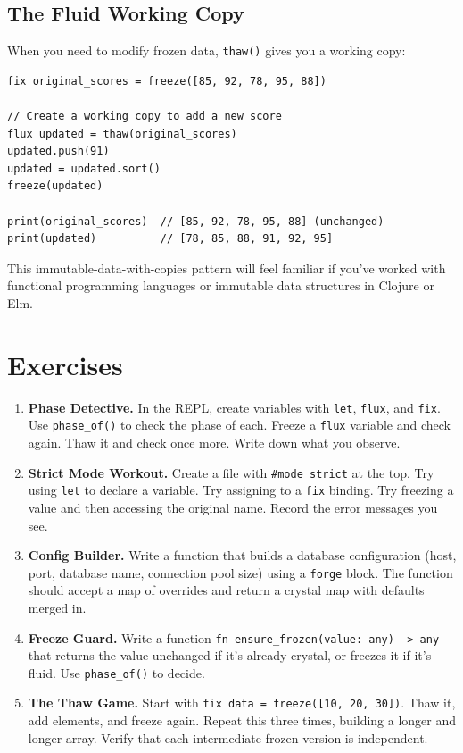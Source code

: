 \subsection{The Fluid Working Copy}\label{subsec:fluid-copy}

When you need to modify frozen data, \lstinline|thaw()| gives you a working copy:

\begin{lstlisting}[language=Lattice, caption={Working with a thawed copy}]
fix original_scores = freeze([85, 92, 78, 95, 88])

// Create a working copy to add a new score
flux updated = thaw(original_scores)
updated.push(91)
updated = updated.sort()
freeze(updated)

print(original_scores)  // [85, 92, 78, 95, 88] (unchanged)
print(updated)          // [78, 85, 88, 91, 92, 95]
\end{lstlisting}

This immutable-data-with-copies pattern will feel familiar if you've worked with functional programming languages or immutable data structures in Clojure or Elm.

\section{Exercises}\label{sec:ch04-exercises}

\begin{enumerate}
  \item \textbf{Phase Detective.}
  In the REPL, create variables with \lstinline|let|, \lstinline|flux|, and \lstinline|fix|.
  Use \lstinline|phase_of()| to check the phase of each.
  Freeze a \lstinline|flux| variable and check again.
  Thaw it and check once more.
  Write down what you observe.

  \item \textbf{Strict Mode Workout.}
  Create a file with \lstinline|#mode strict| at the top.
  Try using \lstinline|let| to declare a variable.
  Try assigning to a \lstinline|fix| binding.
  Try freezing a value and then accessing the original name.
  Record the error messages you see.

  \item \textbf{Config Builder.}
  Write a function that builds a database configuration (host, port, database name, connection pool size) using a \lstinline|forge| block.
  The function should accept a map of overrides and return a crystal map with defaults merged in.

  \item \textbf{Freeze Guard.}
  Write a function \lstinline|fn ensure_frozen(value: any) -> any| that returns the value unchanged if it's already crystal, or freezes it if it's fluid.
  Use \lstinline|phase_of()| to decide.

  \item \textbf{The Thaw Game.}
  Start with \lstinline|fix data = freeze([10, 20, 30])|.
  Thaw it, add elements, and freeze again.
  Repeat this three times, building a longer and longer array.
  Verify that each intermediate frozen version is independent.
\end{enumerate}

